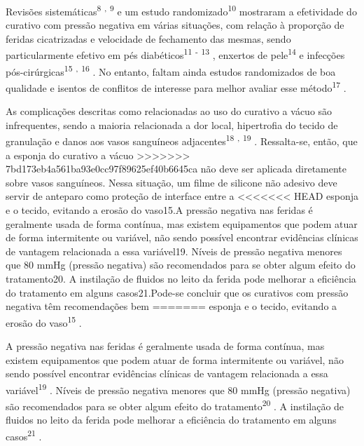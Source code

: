 \documentclass[numberinsection,times,10pt,spreadimages]{memoir}
\begin{document}
Revisões sistemáticas\textsuperscript{8}
\textsuperscript{,}
\textsuperscript{9}
e um estudo randomizado\textsuperscript{10}
mostraram a efetividade do curativo com pressão
negativa em várias situações, com relação à proporção de feridas cicatrizadas e
velocidade de fechamento das mesmas, sendo particularmente efetivo em pés
diabéticos\textsuperscript{11}
\textsuperscript{-}
\textsuperscript{13}
, enxertos de pele\textsuperscript{14}
e infecções pós-cirúrgicas\textsuperscript{15}
\textsuperscript{,}
\textsuperscript{16}
. No entanto, faltam ainda estudos randomizados
de boa qualidade e isentos de conflitos de interesse para melhor avaliar esse
método\textsuperscript{17}
.

As complicações descritas como relacionadas ao uso do curativo a vácuo são
infrequentes, sendo a maioria relacionada a dor local, hipertrofia do tecido de
granulação e danos aos vasos sanguíneos adjacentes\textsuperscript{18}
\textsuperscript{,}
\textsuperscript{19}
. Ressalta-se, então, que a esponja do curativo a vácuo
>>>>>>> 7bd173eb4a561ba93e0cc97f89625ef40b6645ca
não deve ser aplicada diretamente sobre vasos sanguíneos. Nessa situação, um
filme
de silicone não adesivo deve servir de anteparo como proteção de interface entre
a
<<<<<<< HEAD
esponja e o tecido, evitando a erosão do vaso15.A pressão negativa nas feridas é
geralmente usada de forma contínua, mas existem
equipamentos que podem atuar de forma intermitente ou variável, não sendo
possível
encontrar evidências clínicas de vantagem relacionada a essa variável19. Níveis
de pressão negativa
menores que 80 mmHg (pressão negativa) são recomendados para se obter algum
efeito
do tratamento20. A instilação de
fluidos no leito da ferida pode melhorar a eficiência do tratamento em alguns
casos21.Pode-se concluir que os curativos com pressão negativa têm recomendações
bem
=======
esponja e o tecido, evitando a erosão do vaso\textsuperscript{15}
.

A pressão negativa nas feridas é geralmente usada de forma contínua, mas existem
equipamentos que podem atuar de forma intermitente ou variável, não sendo
possível
encontrar evidências clínicas de vantagem relacionada a essa
variável\textsuperscript{19}
. Níveis de pressão negativa
menores que 80 mmHg (pressão negativa) são recomendados para se obter algum
efeito
do tratamento\textsuperscript{20}
. A instilação de
fluidos no leito da ferida pode melhorar a eficiência do tratamento em alguns
casos\textsuperscript{21}
.
\end{document}
